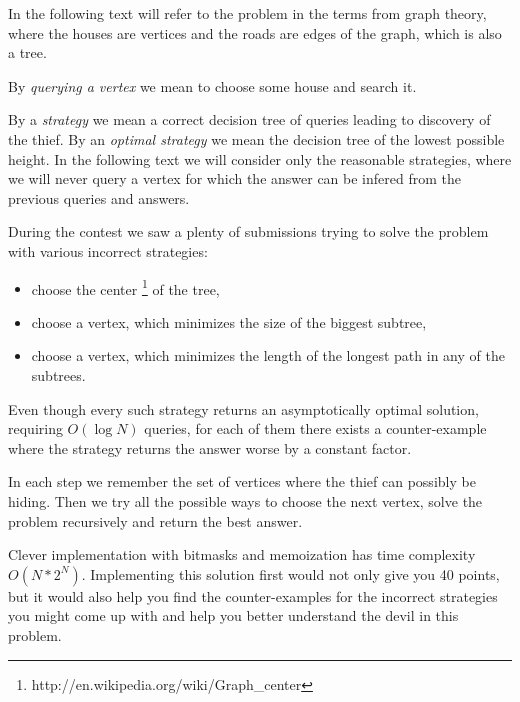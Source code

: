 


In the following text will refer to the problem in the terms from graph theory,
where the houses are vertices and the roads are edges of the graph, which is also a
tree.

By \emph{querying a vertex} we mean to choose some house and search it.

By a \emph{strategy} we mean a correct decision tree of queries leading to discovery of the thief.
By an \emph{optimal strategy} we mean the decision tree of the lowest possible height.
In the following text we will consider only the reasonable strategies, where
we will never query a vertex for which the answer can be infered from the previous queries and answers.



During the contest we saw a plenty of submissions trying to solve the problem
with various incorrect strategies:
\begin{itemize}
\item choose the center \footnote{http://en.wikipedia.org/wiki/Graph_center} of the tree,
\item choose a vertex, which minimizes the size of the biggest subtree,
\item choose a vertex, which minimizes the length of the longest path in any of the subtrees.
\end{itemize}

Even though every such strategy returns an asymptotically optimal solution,
requiring $O(\log N)$ queries, for each of them there exists a counter-example
where the strategy returns the answer worse by a constant factor.



In each step we remember the set of vertices where the thief can possibly be hiding.
Then we try all the possible ways to choose the next vertex, solve the problem
recursively and return the best answer.

Clever implementation with bitmasks and memoization has time complexity $O(N*2^N)$.
Implementing this solution first would not only give you 40 points, but it would also
help you find the counter-examples for the incorrect strategies you might come
up with and help you better understand the devil in this problem.


